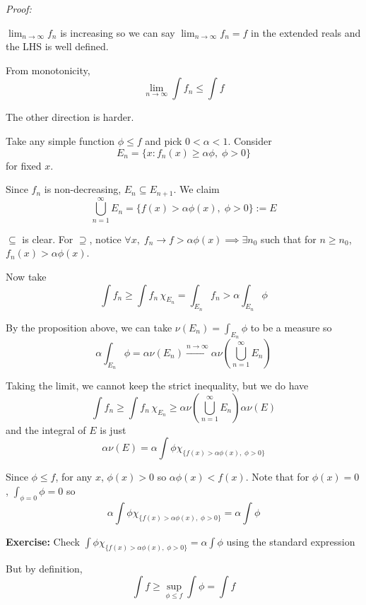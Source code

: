 \documentclass[12pt]{report}
\newcommand{\X}{\chi}
\newcommand{\sub}{\subseteq}
\newenvironment*{tbox}[2][gray]{
    \begin{tcolorbox}[
        parbox=false,
        colback=#1!5!white,
        colframe=#1!75!black,
        breakable,
        title={#2}
    ]}
    {\end{tcolorbox}}
\newenvironment*{exercise}[1][red]{
    \begin{tcolorbox}[
        parbox=false,
        colback=#1!5!white,
        colframe=#1!75!black,
        breakable
    ]}
    {\end{tcolorbox}}
\begin{document}
    \begin{tbox}{\textbf{Theorem (Monotone Convergence Theorem):} Assume $0 \leq f_n \leq f_{n+1}$ for $f$ measurable. Then 
        \[\int \lim_{n\to\infty} f_n \; d\mu = \lim_{n\to\infty} \int f_n \; d\mu\]}
        \emph{Proof:} 

        $\lim_{n \to \infty} f_n$ is increasing so we can say $\lim_{n \to \infty} f_n = f$ in the extended reals and the LHS is well defined. 

        From monotonicity, 
        \[\lim_{n \to \infty} \int f_n \leq \int f\]

        The other direction is harder. 

        Take any simple function $\phi \leq f$ and pick $0 < \alpha < 1$. Consider 
        \[E_n = \{x: f_n(x) \geq \alpha \phi,\; \phi > 0\} \]
        for fixed $x$. 

        Since $f_n$ is non-decreasing, $E_n \sub E_{n+1}$. We claim 
        \[\bigcup_{n=1}^\infty E_n = \{f(x) > \alpha \phi(x),\; \phi > 0\} := E\] 

        $\sub$ is clear. For $\supseteq$, notice $\forall x, \; f_n \to f > \alpha \phi(x) \implies \exists n_0$ such that for $n \geq n_0$, $f_n(x) > \alpha \phi(x)$.

        Now take 
        \[\int f_n \geq \int f_n \, \X_{E_n} = \int_{E_n} f_n > \alpha \int_{E_n} \phi\]

        By the proposition above, we can take $\nu(E_n) = \int_{E_n} \phi$ to be a measure so 
        \[\alpha \int_{E_n} \phi = \alpha \nu(E_n) \overset{n\to \infty}{\longrightarrow} \alpha \nu\left(\bigcup_{n=1}^\infty E_n\right)\]

        Taking the limit, we cannot keep the strict inequality, but we do have 
        \[\int f_n \geq \int f_n \, \X_{E_n} \geq \alpha \nu\left(\bigcup_{n=1}^\infty E_n\right) \alpha \nu(E)\] 
        and the integral of $E$ is just 
        \[\alpha \nu(E) = \alpha \int \phi \X_{\{f(x) > \alpha \phi(x),\; \phi > 0\}}\]

        Since $\phi \leq f$, for any $x$, $\phi(x) > 0$ so $\alpha \phi(x) < f(x)$. Note that for $\phi(x) = 0$, $\int_{\phi = 0} \phi = 0$ so 
        \[\alpha \int \phi \X_{\{f(x) > \alpha \phi(x),\; \phi > 0\}} = \alpha \int \phi\]

        \begin{exercise}
            \textbf{Exercise:} Check $\int \phi \X_{\{f(x) > \alpha \phi(x),\; \phi > 0\}} = \alpha \int \phi$ using the standard expression
        \end{exercise}

        But by definition, 
        \[\int f \geq \sup_{\phi \leq f} \int \phi = \int f\]
    \end{tbox}
\end{document}
